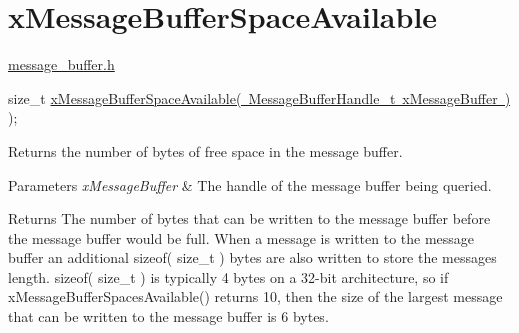 \hypertarget{group__x_message_buffer_space_available}{}\section{x\+Message\+Buffer\+Space\+Available}
\label{group__x_message_buffer_space_available}
\mbox{\hyperlink{message__buffer_8h}{message\+\_\+buffer.\+h}} 
\begin{DoxyPre}
size\_t \mbox{\hyperlink{message__buffer_8h_a9f1e75a283ef603e914e10ae354e5ab8}{xMessageBufferSpaceAvailable( MessageBufferHandle\_t xMessageBuffer )}} );
\end{DoxyPre}
 Returns the number of bytes of free space in the message buffer.


\begin{DoxyParams}{Parameters}
{\em x\+Message\+Buffer} & The handle of the message buffer being queried.\\
\hline
\end{DoxyParams}
\begin{DoxyReturn}{Returns}
The number of bytes that can be written to the message buffer before the message buffer would be full. When a message is written to the message buffer an additional sizeof( size\+\_\+t ) bytes are also written to store the message\textquotesingle{}s length. sizeof( size\+\_\+t ) is typically 4 bytes on a 32-\/bit architecture, so if x\+Message\+Buffer\+Spaces\+Available() returns 10, then the size of the largest message that can be written to the message buffer is 6 bytes. 
\end{DoxyReturn}
